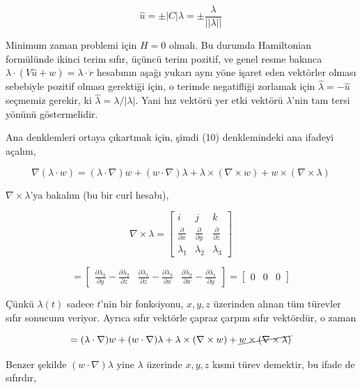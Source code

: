 \documentclass[12pt,fleqn]{article}\usepackage{../../common}
\begin{document}
$$
\hat{u} = \pm |C| \lambda = \pm \frac{\lambda}{||\lambda||}
$$

Minimum zaman problemi için $H=0$ olmalı. Bu durumda Hamiltonian formülünde
ikinci terim sıfır, üçüncü terim pozitif, ve genel resme bakınca
$\lambda \cdot (V \hat{u} + w) = \lambda \cdot \dot{r}$ hesabının aşağı
yukarı aynı yöne işaret eden vektörler olması sebebiyle pozitif olması
gerektiği için, o terimde negatifliği zorlamak için
$\hat{\lambda} = -\hat{u}$ seçmemiz gerekir, ki
$\hat{\lambda} = \lambda / |\lambda|$. Yani hız vektörü yer etki vektörü
$\lambda$'nin tam tersi yönünü göstermelidir.

Ana denklemleri ortaya çıkartmak için, şimdi (10) denklemindeki ana ifadeyi açalım,

$$
\nabla (\lambda \cdot w) = 
(\lambda \cdot \nabla) w + (w \cdot \nabla) \lambda + 
\lambda \times (\nabla \times w) + 
w \times (\nabla \times \lambda)
$$

$\nabla \times \lambda$'ya bakalım (bu bir curl hesabı),

$$
\nabla \times \lambda = \left[\begin{array}{ccc}
i & j & k \\
\frac{\partial }{\partial x} &
\frac{\partial }{\partial y} &
\frac{\partial }{\partial z} \\
\lambda_1 & \lambda_2 & \lambda_3
\end{array}\right]
$$


$$
= \left[\begin{array}{ccc} 
\frac{\partial \lambda_3}{\partial y} - \frac{\partial \lambda_2}{\partial z} & 
\frac{\partial \lambda_1}{\partial z} - \frac{\partial \lambda_3}{\partial x} & 
\frac{\partial \lambda_2}{\partial x} - \frac{\partial \lambda_1}{\partial y} 
\end{array}\right] 
= \left[\begin{array}{ccc} 
0 & 0 & 0
\end{array}\right]
$$

Çünkü $\lambda(t)$ sadece $t$'nin bir fonksiyonu, $x,y,z$ üzerinden
alınan tüm türevler sıfır sonucunu veriyor. Ayrıca sıfır vektörle
çapraz çarpım sıfır vektördür, o zaman 

$$
 = 
(\lambda \cdot \nabla) w + (w \cdot \nabla) \lambda + 
\lambda \times (\nabla \times w) + 
\cancel{w \times (\nabla \times \lambda)}
$$

Benzer şekilde $(w \cdot \nabla) \lambda$ yine $\lambda$ üzerinde
$x,y,z$ kısmi türev demektir, bu ifade de sıfırdır,
\end{document}
